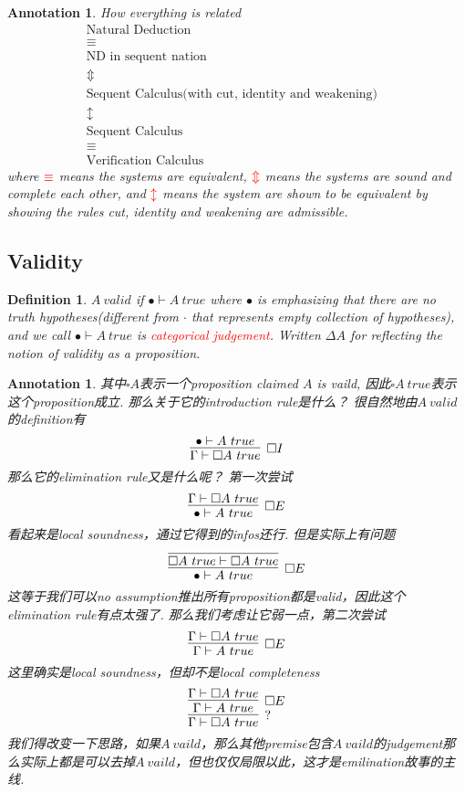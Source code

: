 \documentclass{article}
\theoremstyle{plain}
\newtheorem{definition}[theorem]{Definition}
\newtheorem{annotation}[theorem]{Annotation}
\theoremstyle{nonumberplain}
\newcommand{\redt}[1]{\textcolor{red}{#1}}
\begin{document}
\begin{annotation}
\rm How everything is related
$$
\begin{array}{cc}
\text{Natural Deduction} \\
\equiv \\
\text{ND in sequent nation} \\
\Updownarrow \\
\text{Sequent Calculus(with cut, identity and weakening)}&\\
\updownarrow \\
\text{Sequent Calculus}& \\
\equiv \\
\text{Verification Calculus}
\end{array}
$$
where $\redt{\equiv}$ means the systems are equivalent, $\redt{\Updownarrow}$ means the systems are sound and complete each other, and $\redt{\updownarrow}$ means the system are shown to be equivalent by showing the rules cut, identity and weakening are admissible. 
\end{annotation}

\newpage
\subsection{Validity}

\begin{definition}
\rm $A~valid$ if $\bullet \vdash A~true$ where $\bullet$ is emphasizing that there are no truth hypotheses(different from $\cdot$ that represents empty collection of hypotheses), and we call $\bullet \vdash A~true$ is \redt{categorical judgement}. Written $\Delta A$ for reflecting the notion of validity as a proposition. 
\end{definition}

\begin{annotation}
\rm 其中$\square A$表示一个proposition claimed $A$ is vaild, 因此$\square A ~true$表示这个proposition成立. 那么关于它的introduction rule是什么？ 很自然地由$A ~ valid$的definition有
$$
\infer[\square I]{\Gamma \vdash \square A~true}{\bullet \vdash A~true}
$$
那么它的elimination rule又是什么呢？ 第一次尝试
$$
\infer[\square E]{\bullet \vdash A~true}{\Gamma \vdash \square A~true}
$$
看起来是local soundness，通过它得到的infos还行. 但是实际上有问题
$$
\infer[\square E]{\bullet \vdash A~true}{\infer{\square A~true \vdash \square A~true}{}}
$$
这等于我们可以no assumption推出所有proposition都是valid，因此这个elimination rule有点太强了. 那么我们考虑让它弱一点，第二次尝试
$$
\infer[\square E]{\Gamma \vdash A~true}{\Gamma \vdash \square A~true}
$$
这里确实是local soundness，但却不是local completeness
$$
\infer[?]{\Gamma \vdash \square A~true}{\infer[\square E]{\Gamma \vdash A~true}{\Gamma \vdash \square A~true}}
$$
我们得改变一下思路，如果$A~vaild$，那么其他premise包含$A~vaild$的judgement那么实际上都是可以去掉$A~vaild$，但也仅仅局限以此，这才是emilination故事的主线. 
\end{annotation}
\end{document}

